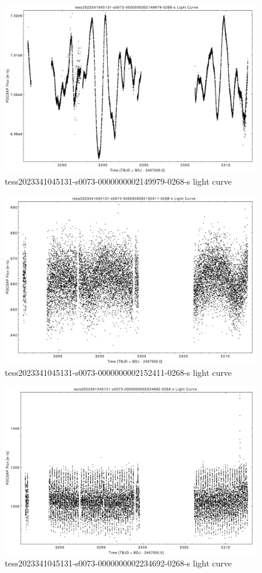 \documentclass[a4paper,12pt]{article}
\begin{document}
\begin{figure}[htbp]
    \centering
    \includegraphics[width = 1\textwidth]{
      lightcurves/tess2023341045131-s0073-0000000002149979-0268-s.pdf}
    \caption{tess2023341045131-s0073-0000000002149979-0268-s light curve}
\end{figure}
\begin{figure}[htbp]
    \centering
    \includegraphics[width = 1\textwidth]{
      lightcurves/tess2023341045131-s0073-0000000002152411-0268-s.pdf}
    \caption{tess2023341045131-s0073-0000000002152411-0268-s light curve}
\end{figure}
\begin{figure}[htbp]
    \centering
    \includegraphics[width = 1\textwidth]{
      lightcurves/tess2023341045131-s0073-0000000002234692-0268-s.pdf}
    \caption{tess2023341045131-s0073-0000000002234692-0268-s light curve}
\end{figure}
\end{document}
